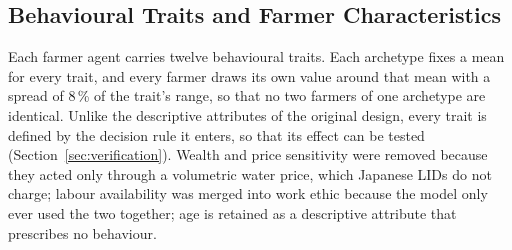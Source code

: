\documentclass{article}
\begin{document}
\subsection{Behavioural Traits and Farmer Characteristics}
\begin{changed}
Each farmer agent carries twelve behavioural traits. Each archetype fixes a mean for every trait, and every farmer draws its own value around that mean with a spread of 8\,\% of the trait's range, so that no two farmers of one archetype are identical. Unlike the descriptive attributes of the original design, every trait is defined by the decision rule it enters, so that its effect can be tested (Section~\ref{sec:verification}). Wealth and price sensitivity were removed because they acted only through a volumetric water price, which Japanese LIDs do not charge; labour availability was merged into work ethic because the model only ever used the two together; age is retained as a descriptive attribute that prescribes no behaviour.


\end{changed}
\end{document}
